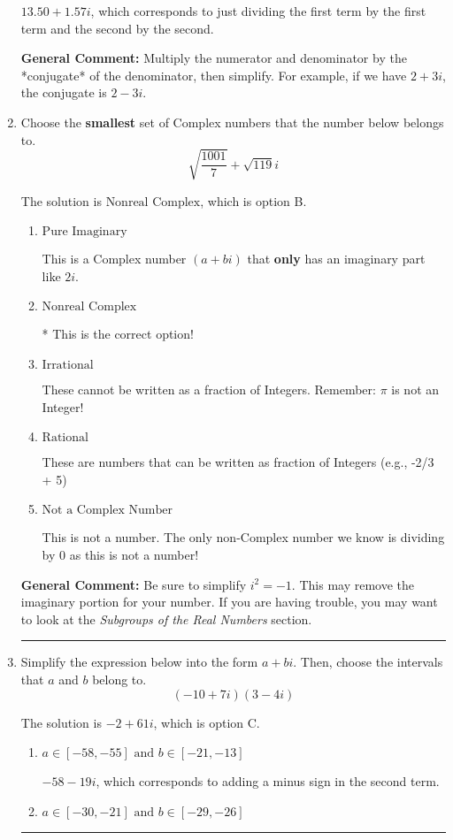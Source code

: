 \documentclass{extbook}[14pt]
\newcommand{\litem}[1]{\item #1

\rule{\textwidth}{0.4pt}}
\begin{document}
\begin{enumerate}
{\begin{enumerate}[label=\Alph*.]
 $13.50  + 1.57 i$, which corresponds to just dividing the first term by the first term and the second by the second.
\end{enumerate}

\textbf{General Comment:} Multiply the numerator and denominator by the *conjugate* of the denominator, then simplify. For example, if we have $2+3i$, the conjugate is $2-3i$.
}
\litem{
Choose the \textbf{smallest} set of Complex numbers that the number below belongs to.
\[ \sqrt{\frac{1001}{7}}+\sqrt{119} i \]

The solution is \( \text{Nonreal Complex} \), which is option B.\begin{enumerate}[label=\Alph*.]
\item \( \text{Pure Imaginary} \)

This is a Complex number $(a+bi)$ that \textbf{only} has an imaginary part like $2i$.
\item \( \text{Nonreal Complex} \)

* This is the correct option!
\item \( \text{Irrational} \)

These cannot be written as a fraction of Integers. Remember: $\pi$ is not an Integer!
\item \( \text{Rational} \)

These are numbers that can be written as fraction of Integers (e.g., -2/3 + 5)
\item \( \text{Not a Complex Number} \)

This is not a number. The only non-Complex number we know is dividing by 0 as this is not a number!
\end{enumerate}

\textbf{General Comment:} Be sure to simplify $i^2 = -1$. This may remove the imaginary portion for your number. If you are having trouble, you may want to look at the \textit{Subgroups of the Real Numbers} section.
}
\litem{
Simplify the expression below into the form $a+bi$. Then, choose the intervals that $a$ and $b$ belong to.
\[ (-10 + 7 i)(3 - 4 i) \]

The solution is \( -2 + 61 i \), which is option C.\begin{enumerate}[label=\Alph*.]
\item \( a \in [-58, -55] \text{ and } b \in [-21, -13] \)

 $-58 - 19 i$, which corresponds to adding a minus sign in the second term.
\item \( a \in [-30, -21] \text{ and } b \in [-29, -26] \)


\end{enumerate}}
\end{enumerate}
\end{document}
